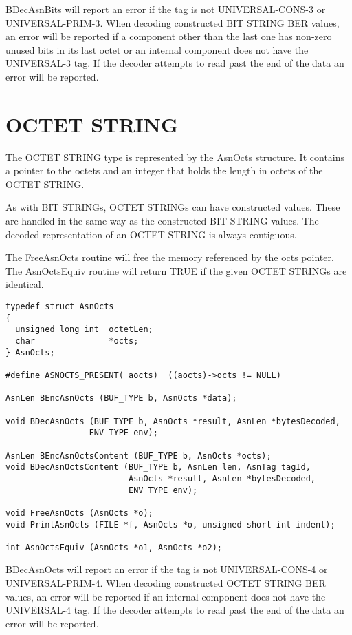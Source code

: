 {\C BDecAsnBits} will report an error if the tag is not UNIVERSAL-CONS-3 or UNIVERSAL-PRIM-3.
When decoding constructed BIT STRING BER values, an error will be reported if a component other than the last one has non-zero unused bits in its last octet or an internal component does not have the UNIVERSAL-3 tag.
If the decoder attempts to read past the end of the data an error will be reported.


\section{\label{octets-C-section}OCTET STRING}
The OCTET STRING type is represented by the {\C AsnOcts} structure.
It contains a pointer to the octets and an integer that holds the length in octets of the OCTET STRING\@.

As with BIT STRINGs, OCTET STRINGs can have constructed values.  These
are handled in the same way as the constructed BIT STRING values. The
decoded representation of an OCTET STRING is always contiguous.

The {\C FreeAsnOcts} routine will free the memory referenced by the
{\C octs} pointer.  The {\C AsnOctsEquiv} routine will return TRUE
if the given OCTET STRINGs are identical.

\begin{small}
\begin{verbatim}
typedef struct AsnOcts
{
  unsigned long int  octetLen;
  char               *octs;
} AsnOcts;

#define ASNOCTS_PRESENT( aocts)  ((aocts)->octs != NULL)

AsnLen BEncAsnOcts (BUF_TYPE b, AsnOcts *data);

void BDecAsnOcts (BUF_TYPE b, AsnOcts *result, AsnLen *bytesDecoded,
                 ENV_TYPE env);

AsnLen BEncAsnOctsContent (BUF_TYPE b, AsnOcts *octs);
void BDecAsnOctsContent (BUF_TYPE b, AsnLen len, AsnTag tagId,
                         AsnOcts *result, AsnLen *bytesDecoded,
                         ENV_TYPE env);

void FreeAsnOcts (AsnOcts *o);
void PrintAsnOcts (FILE *f, AsnOcts *o, unsigned short int indent);

int AsnOctsEquiv (AsnOcts *o1, AsnOcts *o2);
\end{verbatim}
\end{small}

{\C BDecAsnOcts} will report an error if the tag is not
UNIVERSAL-CONS-4 or UNIVERSAL-PRIM-4.  When decoding constructed OCTET
STRING BER values, an error will be reported if an internal component
does not have the UNIVERSAL-4 tag. If the decoder attempts to read
past the end of the data an error will be reported.


